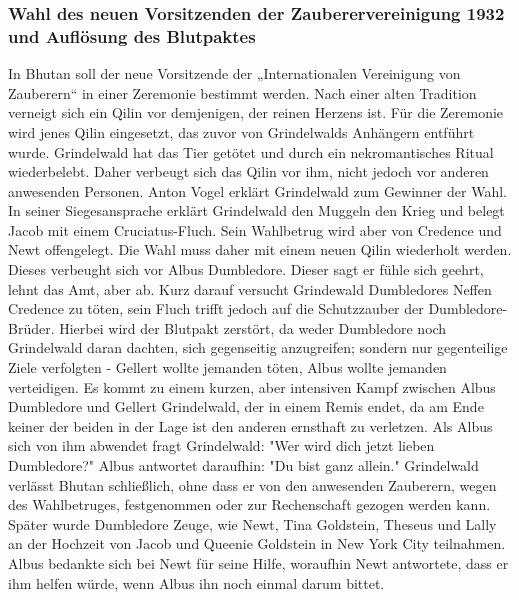 \documentclass[a4paper, 10pt]{article}
\begin{document}
\subsubsection*{Wahl des neuen Vorsitzenden der Zauberervereinigung 1932 und Auflösung des Blutpaktes}
In Bhutan soll der neue Vorsitzende der „Internationalen Vereinigung von Zauberern“ in einer Zeremonie bestimmt werden. Nach einer alten Tradition verneigt sich ein Qilin vor demjenigen, der reinen Herzens ist. Für die Zeremonie wird jenes Qilin eingesetzt, das zuvor von Grindelwalds Anhängern entführt wurde. Grindelwald hat das Tier getötet und durch ein nekromantisches Ritual wiederbelebt. Daher verbeugt sich das Qilin vor ihm, nicht jedoch vor anderen anwesenden Personen. Anton Vogel erklärt Grindelwald zum Gewinner der Wahl.
\vspace{10pt}
\newline
{}  
In seiner Siegesansprache erklärt Grindelwald den Muggeln den Krieg und belegt Jacob mit einem Cruciatus-Fluch. Sein Wahlbetrug wird aber von Credence und Newt offengelegt. Die Wahl muss daher mit einem neuen Qilin wiederholt werden. Dieses verbeught sich vor Albus Dumbledore. Dieser sagt er fühle sich geehrt, lehnt das Amt, aber ab. Kurz darauf versucht Grindewald Dumbledores Neffen Credence zu töten, sein Fluch trifft jedoch auf die Schutzzauber der Dumbledore-Brüder. Hierbei wird der Blutpakt zerstört, da weder Dumbledore noch Grindelwald daran dachten, sich gegenseitig anzugreifen; sondern nur gegenteilige Ziele verfolgten - Gellert wollte jemanden töten, Albus wollte jemanden verteidigen.
\vspace{10pt}
\newline
{}  
Es kommt zu einem kurzen, aber intensiven Kampf zwischen Albus Dumbledore und Gellert Grindelwald, der in einem Remis endet, da am Ende keiner der beiden in der Lage ist den anderen ernsthaft zu verletzen. Als Albus sich von ihm abwendet fragt Grindelwald: "Wer wird dich jetzt lieben Dumbledore?" Albus antwortet daraufhin: "Du bist ganz allein." Grindelwald verlässt Bhutan schließlich, ohne dass er von den anwesenden Zauberern, wegen des Wahlbetruges, festgenommen oder zur Rechenschaft gezogen werden kann. Später wurde Dumbledore Zeuge, wie Newt, Tina Goldstein, Theseus und Lally an der Hochzeit von Jacob und Queenie Goldstein in New York City teilnahmen. Albus bedankte sich bei Newt für seine Hilfe, woraufhin Newt antwortete, dass er ihm helfen würde, wenn Albus ihn noch einmal darum bittet.
\end{document}
